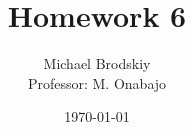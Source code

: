 


\title{Homework 6}
\date{\today}
\author{Michael Brodskiy\\ \small Professor: M. Onabajo}



\maketitle

